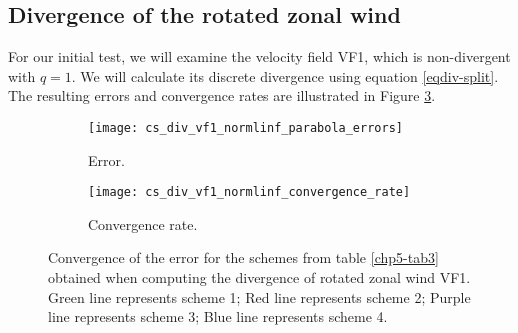 \subsection{Divergence of the rotated zonal wind}
For our initial test, we will examine the velocity field VF1, which is non-divergent with $q=1$.
We will calculate its discrete divergence using equation \eqref{eqdiv-split}.
The resulting errors and convergence rates are illustrated in Figure \ref{chp5-error-div}.
\begin{figure}[!htb]
	\centering
	\begin{subfigure}{0.42\textwidth}
		\centering
		\texttt{[image: cs\_div\_vf1\_normlinf\_parabola\_errors]}
		\caption{Error.\label{chp5-errordiv}}
	\end{subfigure}
	\begin{subfigure}{0.42\textwidth}
		\centering
		\texttt{[image: cs\_div\_vf1\_normlinf\_convergence\_rate]}
		\caption{Convergence rate.\label{chp5-crdiv}}
	\end{subfigure}
	\caption{Convergence of the error for the schemes from table \ref{chp5-tab3} obtained when computing the divergence of rotated zonal wind VF1.
	Green line represents scheme 1;
	Red line represents scheme 2;
	Purple line represents scheme 3;
	Blue line represents scheme 4.
	\label{chp5-error-div}}
\end{figure}

